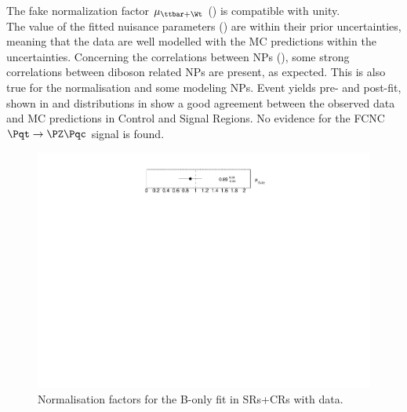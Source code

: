 The fake normalization factor $\mu_{\ttbar+\Wt}$ () is compatible with unity.\\
The value of the fitted nuisance parameters () are within their prior uncertainties,
meaning that the data are well modelled with the MC predictions within the uncertainties.
Concerning the correlations between NPs
(), some strong correlations
between diboson related NPs are present, as expected. This is also
true for the \ttbar normalisation and some \ttbar modeling NPs. 
Event yields pre- and post-fit, shown in  and distributions in  show a good agreement between the observed data and MC predictions in Control and Signal Regions. No evidence for the FCNC $\mathrm{\Pqt\rightarrow\PZ\Pqc}$ signal is found.

\begin{figure}[htbp]
	\centering
	\includegraphics[width=.5\textwidth]{Appendices/AP10/figures/BONLY_CRSR_DL1rc_unblind/NormFactors}
	\caption{Normalisation factors for the B-only \tZc fit in SRs+CRs with data.}%
	\label{fig:stat:tzc:bonly:crsr:norm_unb}
\end{figure}
\restoregeometry

